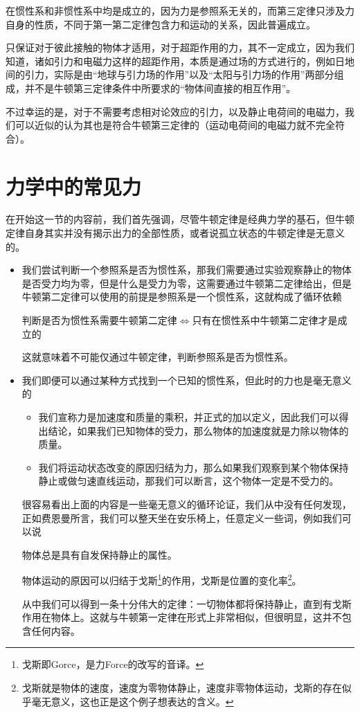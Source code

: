 在惯性系和非惯性系中均是成立的，因为力是参照系无关的，而第三定律只涉及力自身的性质，不同于第一第二定律包含力和运动的关系，因此普遍成立。

只保证对于彼此接触的物体才适用，对于超距作用的力，其不一定成立，因为我们知道，诸如引力和电磁力这样的超距作用，本质是通过场的方式进行的，例如日地间的引力，实际是由“地球与引力场的作用”以及“太阳与引力场的作用”两部分组成，并不是牛顿第三定律条件中所要求的“物体间直接的相互作用”。

不过幸运的是，对于不需要考虑相对论效应的引力，以及静止电荷间的电磁力，我们可以近似的认为其也是符合牛顿第三定律的（运动电荷间的电磁力就不完全符合）。

\section{力学中的常见力}
在开始这一节的内容前，我们首先强调，尽管牛顿定律是经典力学的基石，但牛顿定律自身其实并没有揭示出力的全部性质，或者说孤立状态的牛顿定律是无意义的。
\begin{itemize}
    \item 我们尝试判断一个参照系是否为惯性系，那我们需要通过实验观察静止的物体是否受力均为零，但是什么是受力为零，这需要通过牛顿第二定律给出，但是牛顿第二定律可以使用的前提是参照系是一个惯性系，这就构成了循环依赖
    \begin{center}
        \small
        判断是否为惯性系需要牛顿第二定律\quad$\Longleftrightarrow$\quad 只有在惯性系中牛顿第二定律才是成立的
    \end{center}
    这就意味着不可能仅通过牛顿定律，判断参照系是否为惯性系。
    \item 我们即便可以通过某种方式找到一个已知的惯性系，但此时的力也是毫无意义的
    \begin{itemize}
        \item 我们宣称力是加速度和质量的乘积，并正式的加以定义，因此我们可以得出结论，如果我们已知物体的受力，那么物体的加速度就是力除以物体的质量。
        \item 我们将运动状态改变的原因归结为力，那么如果我们观察到某个物体保持静止或做匀速直线运动，那我们可以断言，这个物体一定是不受力的。
    \end{itemize}
    很容易看出上面的内容是一些毫无意义的循环论证，我们从中没有任何发现，正如费恩曼所言，我们可以整天坐在安乐椅上，任意定义一些词，例如我们可以说
    \begin{center}
        \small
        
        物体总是具有自发保持静止的属性。
        
        物体运动的原因可以归结于戈斯\footnote{戈斯即Gorce，是力Force的改写的音译。}的作用，戈斯是位置的变化率\footnote{戈斯就是物体的速度，速度为零物体静止，速度非零物体运动，戈斯的存在似乎毫无意义，这也正是这个例子想表达的含义。}。
    \end{center}
    从中我们可以得到一条十分伟大的定律：一切物体都将保持静止，直到有戈斯作用在物体上。这就与牛顿第一定律在形式上非常相似，但很明显，这并不包含任何内容。
\end{itemize}
